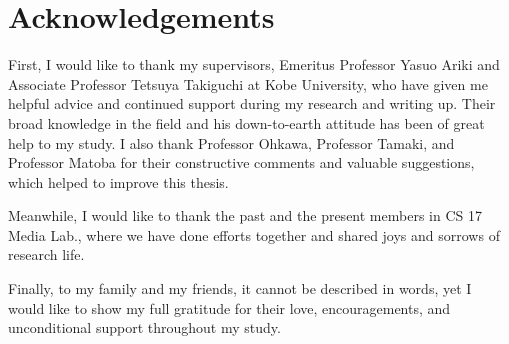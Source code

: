 

\chapter{Acknowledgements}      %

First, I would like to thank my supervisors, Emeritus Professor Yasuo Ariki and Associate Professor Tetsuya Takiguchi at Kobe University, 
who have given me helpful advice and continued support during my research and writing up. 
Their broad knowledge in the field and his down-to-earth attitude has been of great help to my study.  
I also thank Professor Ohkawa, Professor Tamaki, and Professor Matoba for their constructive comments and valuable suggestions, 
which helped to improve this thesis.

Meanwhile, I would like to thank the past and the present members in CS 17 Media Lab., 
where we have done efforts together and shared joys and sorrows of research life.

Finally, to my family and my friends, it cannot be described in words, 
yet I would like to show my full gratitude for their love, encouragements, and unconditional support throughout my study.



